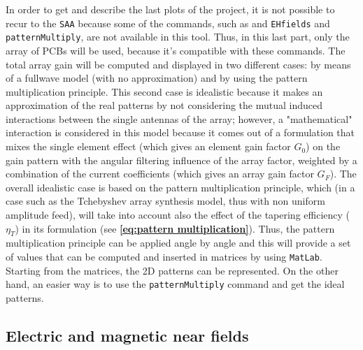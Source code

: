 \documentclass[10 pt,a4paper,twocolumn]{article}
\begin{document}
{In order to get and describe the last plots of the project, it is not possible to recur to the \texttt{\color{Mahogany}SAA} because some of the commands, such as  and \texttt{\color{Turquoise}EHfields} and \texttt{\color{Turquoise}patternMultiply}, are not available in this tool. Thus, in this last part, only the array of PCBs will be used, because it's compatible with these commands. The total array gain will be computed and displayed in two different cases: by means of a fullwave model (with no approximation) and by using the pattern multiplication principle. This second case is idealistic because it makes an approximation of the real patterns by not considering the mutual induced interactions between the single antennas of the array; however, a "mathematical" interaction is considered in this model because it comes out of a formulation that mixes the single element effect (which gives an element gain factor $G_0$) on the gain pattern with the angular filtering influence of the array factor, weighted by a combination of the current coefficients (which gives an array gain factor $G_F$). The overall idealistic case is based on the pattern multiplication principle, which (in a case such as the Tchebyshev array synthesis model, thus with non uniform amplitude feed), will take into account also the effect of the tapering efficiency ($\eta_T$) in its formulation (see \textbf{\cref{eq:pattern multiplication}}). Thus, the pattern multiplication principle can be applied angle by angle and this will provide a set of values that can be computed and inserted in matrices by using \texttt{\color{BurntOrange}MatLab}. Starting from the matrices, the 2D patterns can be represented. On the other hand, an easier way is to use the \texttt{\color{Turquoise}patternMultiply} command and get the ideal patterns. 


\subsection*{Electric and magnetic near fields}

}
\end{document}
